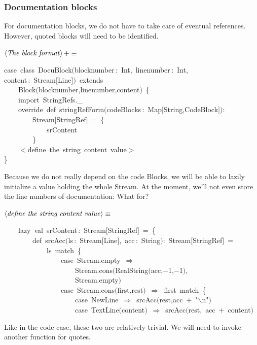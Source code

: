 \documentclass[a4paper,12pt]{article}
\begin{document}
\subsubsection{Documentation blocks}
For documentation blocks, we do not have to take care of eventual references.
However, quoted blocks will need to be identified.

$\left<\mbox{\emph{The block format}}\right>+\equiv$
\begin{program}{\vem case}~{\vem class}~DocuBlock$($blocknumber\,{\rm :}~Int,~linenumber\,{\rm :}~Int,
\\content\,{\rm :}~Stream$[$Line$]$$)$~{\vem extends}
\\~~~~Block$($blocknumber,linenumber,content$)$~{\small\{}
\\~~~~{\vem import}~StringRefs.\_
\\~~~~{\vem override}~{\vem def}~stringRefForm$($codeBlocks\,{\rm :}~Map$[$String,CodeBlock$]$$)${\rm :}
\\~~~~~~~~Stream$[$StringRef$]$~=~{\small\{}
\\~~~~~~~~~~~~srContent
\\~~~~~~~~{\small\}}
\\~~~~$<$define~the~string~content~value$>$
\\{\small\}}
\\[0.5em]\end{program}
Because we do not really depend on the code Blocks, we will be able
to lazily initialize a value holding the whole Stream. At the moment,
we'll not even store the line numbers of documentation: What for?

$\left<\mbox{\emph{define the string content value}}\right>\equiv$
\begin{program}~~~~{\vem lazy}~{\vem val}~srContent\,{\rm :}~Stream$[$StringRef$]$~=~{\small\{}
\\~~~~~~~~{\vem def}~srcAcc$($ls\,{\rm :}~Stream$[$Line$]$,~acc\,{\rm :}~String$)${\rm :}~Stream$[$StringRef$]$~=
\\~~~~~~~~~~~~ls~{\vem match}~{\small\{}
\\~~~~~~~~~~~~~~~~{\vem case}~Stream.empty~$\Rightarrow$
\\~~~~~~~~~~~~~~~~~~~~Stream.cons$($RealString$($acc,$-$1,$-$1$)$,
\\~~~~~~~~~~~~~~~~~~~~Stream.empty$)$
\\~~~~~~~~~~~~~~~~{\vem case}~Stream.cons$($first,rest$)$~$\Rightarrow$~first~{\vem match}~{\small\{}
\\~~~~~~~~~~~~~~~~~~~~{\vem case}~NewLine~$\Rightarrow$~srcAcc$($rest,acc~$+$~"$\backslash$n"$)$
\\~~~~~~~~~~~~~~~~~~~~{\vem case}~TextLine$($content$)$~$\Rightarrow$~srcAcc$($rest,~acc~$+$~content$)$
\\[0.5em]\end{program}
Like in the code case, these two are relatively trivial. We will need
to invoke another function for quotes.
\end{document}
